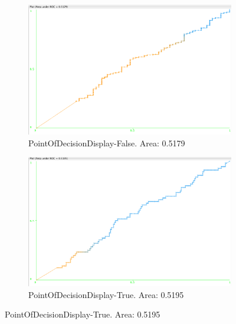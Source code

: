 \documentclass[11pt, notitlepage,abstracton,oneside]{article}   	%
\begin{document}
\begin{figure}[H]
    \begin{subfigure}[b]{0.45\textwidth}
        \centering
        \includegraphics[width=\textwidth]{figures/approach2/PointOfDecisionDisplay-False(0)}
        \caption{PointOfDecisionDisplay-False. Area: 0.5179}
        \label{fig:PointOfDecisionDisplay-False(0)}
    \end{subfigure}
    \hfill
    \begin{subfigure}[b]{0.45\textwidth}
        \centering
        \includegraphics[width=\textwidth]{figures/approach2/PointOfDecisionDisplay-True(1)}
        \caption{PointOfDecisionDisplay-True. Area: 0.5195}
        \label{fig:PointOfDecisionDisplay-True(1)}
    \end{subfigure}
    \hfill
\end{figure}
\end{document}
